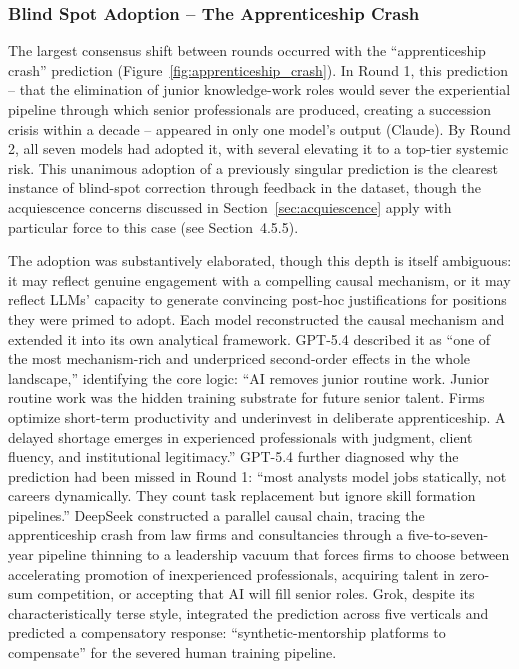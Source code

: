 \documentclass[preprint,review,12pt]{elsarticle}
\begin{document}
\subsubsection{Blind Spot Adoption -- The Apprenticeship Crash}
\label{sec:blind_spot_adoption}

The largest consensus shift between rounds occurred with the ``apprenticeship crash'' prediction (Figure~\ref{fig:apprenticeship_crash}). In Round 1, this prediction -- that the elimination of junior knowledge-work roles would sever the experiential pipeline through which senior professionals are produced, creating a succession crisis within a decade -- appeared in only one model's output (Claude). By Round 2, all seven models had adopted it, with several elevating it to a top-tier systemic risk. This unanimous adoption of a previously singular prediction is the clearest instance of blind-spot correction through feedback in the dataset, though the acquiescence concerns discussed in Section~\ref{sec:acquiescence} apply with particular force to this case (see Section~4.5.5).

The adoption was substantively elaborated, though this depth is itself ambiguous: it may reflect genuine engagement with a compelling causal mechanism, or it may reflect LLMs' capacity to generate convincing post-hoc justifications for positions they were primed to adopt. Each model reconstructed the causal mechanism and extended it into its own analytical framework. GPT-5.4 described it as ``one of the most mechanism-rich and underpriced second-order effects in the whole landscape,'' identifying the core logic: ``AI removes junior routine work. Junior routine work was the hidden training substrate for future senior talent. Firms optimize short-term productivity and underinvest in deliberate apprenticeship. A delayed shortage emerges in experienced professionals with judgment, client fluency, and institutional legitimacy.'' GPT-5.4 further diagnosed why the prediction had been missed in Round 1: ``most analysts model jobs statically, not careers dynamically. They count task replacement but ignore skill formation pipelines.'' DeepSeek constructed a parallel causal chain, tracing the apprenticeship crash from law firms and consultancies through a five-to-seven-year pipeline thinning to a leadership vacuum that forces firms to choose between accelerating promotion of inexperienced professionals, acquiring talent in zero-sum competition, or accepting that AI will fill senior roles. Grok, despite its characteristically terse style, integrated the prediction across five verticals and predicted a compensatory response: ``synthetic-mentorship platforms to compensate'' for the severed human training pipeline.
\end{document}
